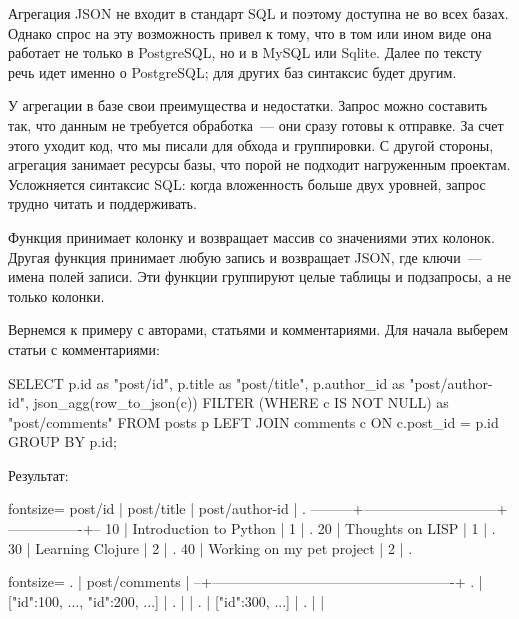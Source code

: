 Агрегация JSON не входит в стандарт SQL и поэтому доступна не во всех базах. Однако спрос на эту возможность привел к тому, что в том или ином виде она работает не только в PostgreSQL, но и в MySQL или Sqlite. Далее по тексту речь идет именно о PostgreSQL; для других баз синтаксис будет другим.

У агрегации в базе свои преимущества и недостатки. Запрос можно составить так, что данным не требуется обработка~--- они сразу готовы к отправке. За счет этого уходит код, что мы писали для обхода и группировки. С другой стороны, агрегация занимает ресурсы базы, что порой не подходит нагруженным проектам. Усложняется синтаксис SQL: когда вложенность больше двух уровней, запрос трудно читать и поддерживать.

Функция  принимает колонку и возвращает массив  со значениями этих колонок. Другая функция  принимает любую запись и возвращает JSON, где ключи~--- имена полей записи. Эти функции группируют целые таблицы и подзапросы, а не только колонки.

Вернемся к примеру с авторами, статьями и комментариями. Для начала выберем статьи с комментариями:


\begin{english}
  \begin{sql/lines}
SELECT
  p.id        as "post/id",
  p.title     as "post/title",
  p.author_id as "post/author-id",
  json_agg(row_to_json(c)) FILTER
          (WHERE c IS NOT NULL) as "post/comments"
FROM posts p
LEFT JOIN comments c ON c.post_id = p.id
GROUP BY p.id;
  \end{sql/lines}
\end{english}

Результат:

\begin{english}
  \begin{text*}{fontsize=\small}
 post/id |         post/title          | post/author-id | .
---------+-----------------------------+----------------+--
      10 | Introduction to Python      |              1 | .
      20 | Thoughts on LISP            |              1 | .
      30 | Learning Clojure            |              2 | .
      40 | Working on my pet project   |              2 | .
  \end{text*}
\end{english}


\begin{english}
  \begin{text*}{fontsize=\small}
. |                    post/comments                   |
--+----------------------------------------------------+
. | [{"id":100, ...}, {"id":200, ...}]                 |
. |                                                    |
. | [{"id":300, ...}]                                  |
. |                                                    |
  \end{text*}
\end{english}

